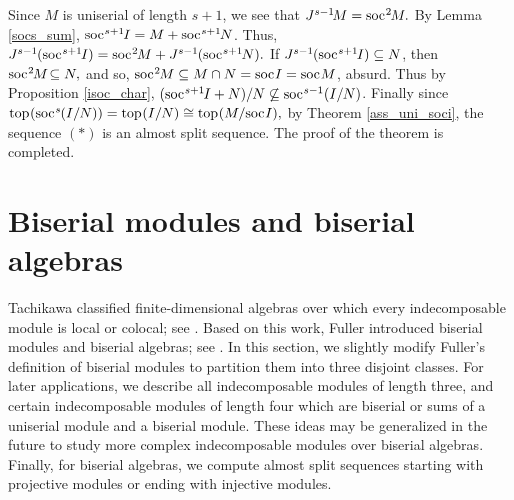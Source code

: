 \documentclass[10pt]{amsart}
\theoremstyle{definition}
\newcommand{\soc}{{\rm soc}\hspace{.5pt}}
\newcommand{\ntop}{{\rm top}\hspace{.5pt}}
\begin{document}
Since $M$ is uniserial of length $s+1$, we see that $J^{s-1}\hspace{-1.5pt} M=\soc^2\hspace{-1pt} M.$ By Lemma \ref{socs_sum}, $\soc^{s+1}\hspace{-1pt}I = M +\soc^{s+1}\hspace{-1pt}N$. Thus, $J^{s-1}\hspace{-.5pt}(\soc^{s+1}\hspace{-1pt}I)=\soc^2\hspace{-1pt}M+J^{s-1}\hspace{-.5pt}(\soc^{s+1}\hspace{-1pt}N).$ If $J^{s-1}\hspace{-.5pt}(\soc^{s+1}\hspace{-1pt}I)\subseteq N$, then $\soc^2\hspace{-1pt}M \! \subseteq N,$ and so, $\soc^2\hspace{-1pt}M\subseteq M\cap N=\soc I=\soc M$, absurd. Thus by Proposition \ref{isoc_char}, $(\soc^{s+1}\hspace{-1pt}I+N)/N\not\subseteq \soc^{s-1}(I/N)$. Finally since $\ntop(\soc^{s}\hspace{-.5pt}(I/N))=\ntop(I/N)\cong \ntop(M/\soc I),$ by Theorem \ref{ass_uni_soci}, the sequence $(*)$ is an almost split sequence. The proof of the theorem is completed. 

\vspace{-4pt}

\section{\sc Biserial modules and biserial algebras}

Tachikawa classified finite-dimensional algebras over which every indecomposable module is local or colocal; see \cite{Tac1}. Based on this work, Fuller introduced biserial modules and biserial algebras; see \cite{Ful}. In this section, we slightly modify Fuller's definition of biserial modules to partition them into three disjoint classes. For later applications, we describe all indecomposable modules of length three, and certain indecomposable modules of length four which are biserial or sums of a uniserial module and a biserial module. These ideas may be generalized in the future to study more complex indecomposable modules over biserial algebras. Finally, for biserial algebras, we compute almost split sequences starting with projective modules or ending with injective modules. 
\end{document}
